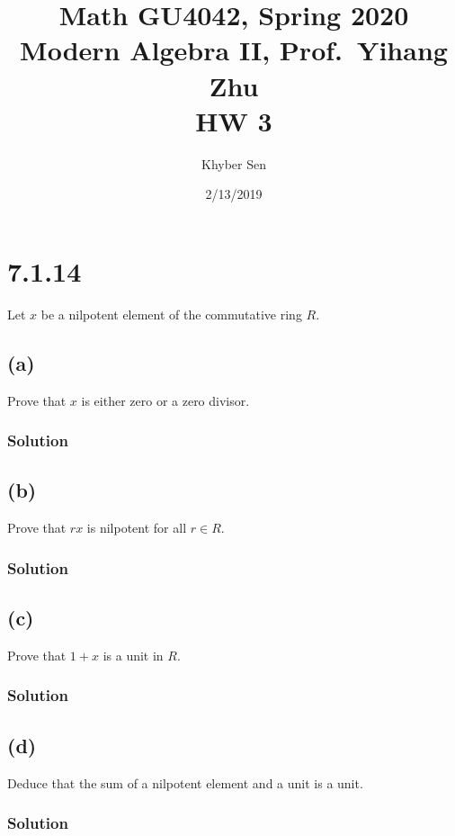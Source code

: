 \documentclass[fleqn]{article}
\title{
Math GU4042, Spring 2020 \\
Modern Algebra II, Prof.\ Yihang Zhu \\
HW 3
}
\author{Khyber Sen}
\date{2/13/2019}
\begin{document}
    
    \maketitle
    
    \section{7.1.14}
    Let $x$ be a nilpotent element of the commutative ring $R$.
        
        \subsection{(a)}
        Prove that $x$ is either zero or a zero divisor.
            
            \subsubsection{Solution}
            
        
        \subsection{(b)}
        Prove that $rx$ is nilpotent for all $r \in R$.
            
            \subsubsection{Solution}
            
        
        \subsection{(c)}
        Prove that $1 + x$ is a unit in $R$.
            
            \subsubsection{Solution}
            
        
        \subsection{(d)}
        Deduce that the sum of a nilpotent element and a unit is a unit.
        
            \subsubsection{Solution}
            
\end{document}
